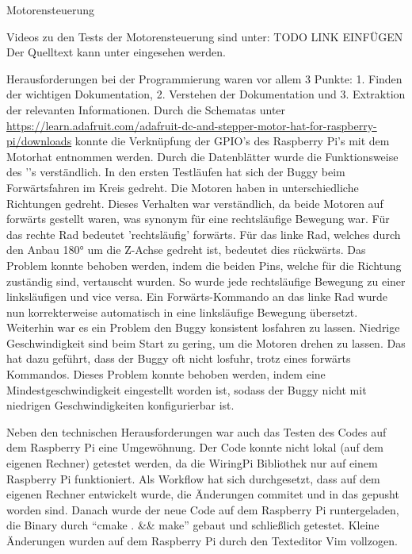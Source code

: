 \documentclass[12pt,twoside]{report}
\begin{document}
\begin{section}{Motorensteuerung}

  Videos zu den Tests der Motorensteuerung sind unter: TODO LINK EINFÜGEN
  Der Quelltext kann unter \githubrepo{} eingesehen werden.

  Herausforderungen bei der Programmierung waren vor allem 3 Punkte: 1. Finden der wichtigen
  Dokumentation, 2. Verstehen der Dokumentation und 3. Extraktion der relevanten
  Informationen.
  Durch die Schematas unter
  \url{https://learn.adafruit.com/adafruit-dc-and-stepper-motor-hat-for-raspberry-pi/downloads}
  konnte die Verknüpfung der GPIO's des Raspberry Pi's mit dem Motorhat entnommen
  werden. Durch die Datenblätter wurde die Funktionsweise des ''s
  verständlich.
  In den ersten Testläufen hat sich der Buggy beim Forwärtsfahren im Kreis
  gedreht. Die Motoren haben in unterschiedliche Richtungen gedreht. Dieses
  Verhalten war verständlich, da beide Motoren auf forwärts gestellt waren, was
  synonym für eine rechtsläufige Bewegung war. Für das rechte Rad bedeutet
  'rechtsläufig' forwärts. Für das linke Rad, welches durch den Anbau 
  \ang{180} um die Z-Achse gedreht ist, bedeutet dies rückwärts.
  Das Problem konnte behoben werden, indem die beiden Pins, welche für die Richtung
  zuständig sind, vertauscht wurden. So wurde jede rechtsläufige Bewegung zu einer
  linksläufigen und vice versa. Ein Forwärts-Kommando an das linke Rad wurde nun
  korrekterweise automatisch in eine linksläufige Bewegung übersetzt.
  Weiterhin war es ein Problem den Buggy konsistent losfahren zu lassen. Niedrige 
  Geschwindigkeit sind beim Start zu gering, um die Motoren drehen zu
  lassen. Das hat dazu geführt, dass der Buggy oft nicht losfuhr, trotz eines
  forwärts Kommandos. Dieses Problem konnte behoben werden, indem eine Mindestgeschwindigkeit
  eingestellt worden ist, sodass der Buggy nicht mit niedrigen Geschwindigkeiten
  konfigurierbar ist.

  Neben den technischen Herausforderungen war auch das Testen des Codes auf dem
  Raspberry Pi eine Umgewöhnung. Der Code konnte nicht lokal (auf dem eigenen
  Rechner) getestet werden, da die WiringPi Bibliothek nur auf einem Raspberry Pi funktioniert.
  Als Workflow hat sich durchgesetzt, dass auf dem eigenen Rechner entwickelt
  wurde, die Änderungen commitet und in das \githubrepo gepusht worden sind.
  Danach wurde der neue Code auf dem Raspberry Pi runtergeladen, die Binary
  durch ``cmake . \&\& make'' gebaut und schließlich getestet. Kleine Änderungen
  wurden auf dem Raspberry Pi durch den Texteditor Vim vollzogen.



\end{section}
\end{document}

